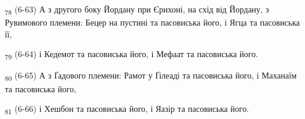 \begin{tcolorbox}
\textsubscript{78} (6-63) А з другого боку Йордану при Єрихоні, на схід від Йордану, з Рувимового племени: Бецер на пустині та пасовиська його, і Ягца та пасовиська її,
\end{tcolorbox}
\begin{tcolorbox}
\textsubscript{79} (6-64) і Кедемот та пасовиська його, і Мефаат та пасовиська його.
\end{tcolorbox}
\begin{tcolorbox}
\textsubscript{80} (6-65) А з Ґадового племени: Рамот у Ґілеаді та пасовиська його, і Маханаїм та пасовиська його,
\end{tcolorbox}
\begin{tcolorbox}
\textsubscript{81} (6-66) і Хешбон та пасовиська його, і Яазір та пасовиська його.
\end{tcolorbox}
